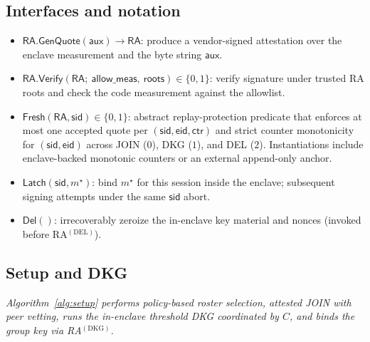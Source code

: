 \documentclass[runningheads,orivec]{llncs}
\newcommand{\sid}{\mathsf{sid}}
\begin{document}
\subsection*{Interfaces and notation}
\begin{itemize}[leftmargin=*,itemsep=0.25em]
  \item $\textsf{RA.GenQuote}(\mathsf{aux}) \rightarrow \mathsf{RA}$:
  produce a vendor-signed attestation over the enclave measurement and the byte string $\mathsf{aux}$.

  \item $\textsf{RA.Verify}(\mathsf{RA};\ \textsf{allow\_meas},\ \textsf{roots}) \in \{0,1\}$:
  verify signature under trusted RA roots and check the code measurement against the allowlist.

  \item $\textsf{Fresh}(\mathsf{RA},\mathsf{sid}) \in \{0,1\}$:
  abstract replay-protection predicate that enforces at most one accepted quote per $(\mathsf{sid},\mathsf{eid},\mathsf{ctr})$
  and strict counter monotonicity for $(\mathsf{sid},\mathsf{eid})$ across JOIN ($0$), DKG ($1$), and DEL ($2$).
  Instantiations include enclave-backed monotonic counters or an external append-only anchor.

  \item $\textsf{Latch}(\sid,m^{\star})$:
  bind $m^{\star}$ for this session inside the enclave; subsequent signing attempts under the same $\sid$ abort.

  \item $\textsf{Del}()$:
  irrecoverably zeroize the in-enclave key material and nonces (invoked before RA$^{(\mathrm{DEL})}$).
\end{itemize}

\subsection{Setup and DKG}
\emph{Algorithm~\ref{alg:setup} performs policy-based roster selection, attested JOIN with peer vetting, runs the in\mbox{-}enclave threshold DKG coordinated by $C$, and binds the group key via RA$^{(\mathrm{DKG})}$.}
\end{document}
